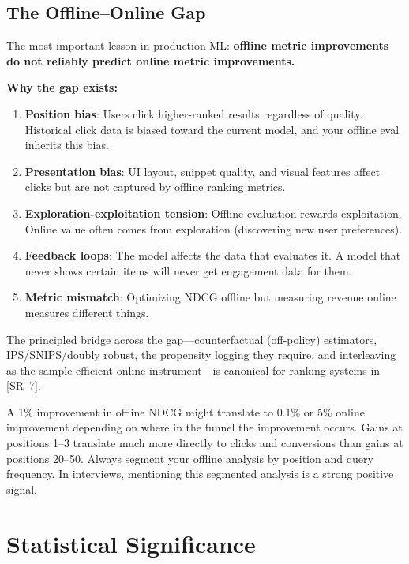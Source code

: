 \subsection{The Offline--Online Gap}

The most important lesson in production ML: \textbf{offline metric improvements do not reliably predict online metric improvements.}

\textbf{Why the gap exists:}
\begin{enumerate}
    \item \textbf{Position bias}: Users click higher-ranked results regardless of quality. Historical click data is biased toward the current model, and your offline eval inherits this bias.
    \item \textbf{Presentation bias}: UI layout, snippet quality, and visual features affect clicks but are not captured by offline ranking metrics.
    \item \textbf{Exploration-exploitation tension}: Offline evaluation rewards exploitation. Online value often comes from exploration (discovering new user preferences).
    \item \textbf{Feedback loops}: The model affects the data that evaluates it. A model that never shows certain items will never get engagement data for them.
    \item \textbf{Metric mismatch}: Optimizing NDCG offline but measuring revenue online measures different things.
\end{enumerate}

The principled bridge across the gap---counterfactual (off-policy) estimators, IPS/SNIPS/doubly robust, the propensity logging they require, and interleaving as the sample-efficient online instrument---is canonical for ranking systems in [SR~7].

\begin{keyinsight}
A 1\% improvement in offline NDCG might translate to 0.1\% or 5\% online improvement depending on where in the funnel the improvement occurs. Gains at positions 1--3 translate much more directly to clicks and conversions than gains at positions 20--50. Always segment your offline analysis by position and query frequency. In interviews, mentioning this segmented analysis is a strong positive signal.
\end{keyinsight}

\section{Statistical Significance}
\label{sec:statistical_significance}

